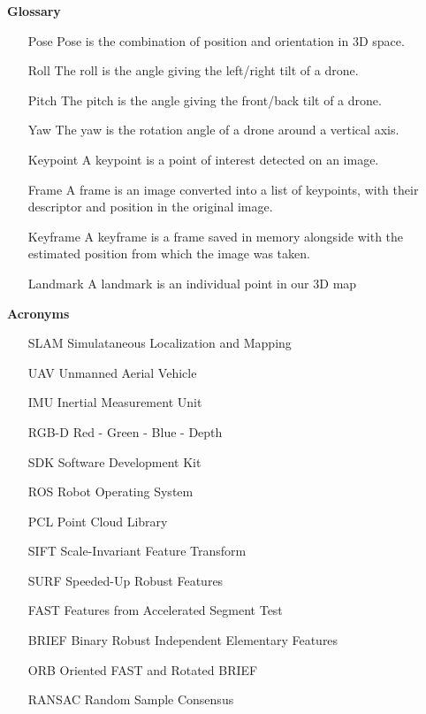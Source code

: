 \clearpage
\vspace{5mm}
{ \Huge \bfseries Glossary }
\vspace{5mm}
\begin{itemize}[font=\bfseries]
\item[Pose] Pose is the combination of position and orientation in 3D space.
\item[Roll] The roll is the angle giving the left/right tilt of a drone.
\item[Pitch] The pitch is the angle giving the front/back tilt of a drone.
\item[Yaw] The yaw is the rotation angle of a drone around a vertical axis.
\item[Keypoint] A keypoint is a point of interest detected on an image.
\item[Frame] A frame is an image converted into a list of keypoints, with their descriptor and position in the original image.
\item[Keyframe] A keyframe is a frame saved in memory alongside with the estimated position from which the image was taken.
\item[Landmark] A landmark is an individual point in our 3D map
\end{itemize}
\vspace{10mm}
{ \Huge \bfseries Acronyms }
\vspace{5mm}
\begin{itemize}[font=\bfseries]
\item[SLAM] Simulataneous Localization and Mapping
\item[UAV] Unmanned Aerial Vehicle
\item[IMU] Inertial Measurement Unit
\item[RGB-D] Red - Green - Blue - Depth
\item[SDK] Software Development Kit
\item[ROS] Robot Operating System
\item[PCL] Point Cloud Library
\item[SIFT] Scale-Invariant Feature Transform
\item[SURF] Speeded-Up Robust Features
\item[FAST] Features from Accelerated Segment Test
\item[BRIEF] Binary Robust Independent Elementary Features
\item[ORB] Oriented FAST and Rotated BRIEF
\item[RANSAC] Random Sample Consensus
\end{itemize}